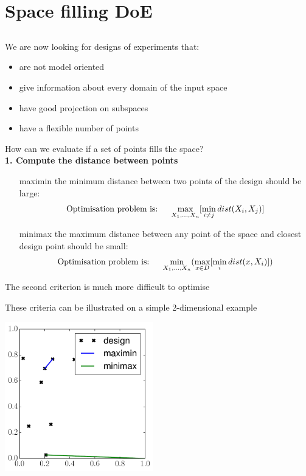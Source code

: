 \documentclass{beamer}
\begin{document}
\section{Space filling DoE}
\subsection{}


\begin{frame}{}
We are now looking for designs of experiments that:
\begin{itemize}
	\item are not model oriented
	\item give information about every domain of the input space
	\item have good projection on subspaces
	\item have a flexible number of points
\end{itemize}
\end{frame}

\begin{frame}{}
How can we evaluate if a set of points fills the space?\\ \vspace{5mm}
\textbf{1. Compute the distance between points}\\
\begin{itemize}
	\item[maximin] the minimum distance between two points of the design should be large:
	$$\text{Optimisation problem is: \quad} \max_{X_1,\dots,X_n} [ \min_{i \neq j} dist(X_i,X_j) ]$$
	\item[minimax] the maximum distance between any point of the space and closest design point should be small:
	$$\text{Optimisation problem is: \quad} \min_{X_1,\dots,X_n} (\max_{x \in D} [ \min_i dist(x,X_i) ])$$
\end{itemize}
The second criterion is much more difficult to optimise
\end{frame}

\begin{frame}{}
These criteria can be illustrated on a simple 2-dimensional example
\begin{center}
\includegraphics[height=6.5cm]{figures/python/spf_minimaxmaximin}
\end{center}
\end{frame}
\end{document}
